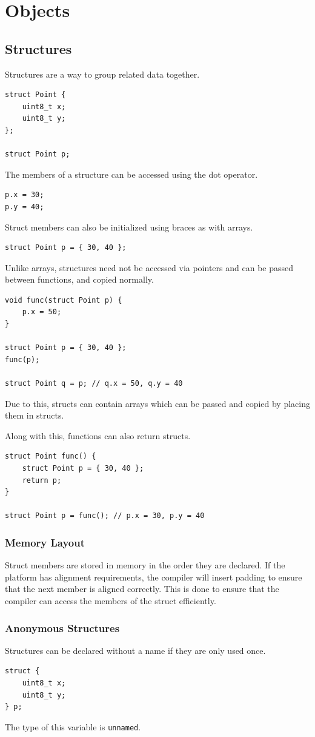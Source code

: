 \documentclass{report}
\begin{document}
\chapter{Objects}
\section{Structures}
Structures are a way to group related data together.
\begin{verbatim}
struct Point {
    uint8_t x;
    uint8_t y;
};

struct Point p;
\end{verbatim}
The members of a structure can be accessed using the dot operator.
\begin{verbatim}
p.x = 30;
p.y = 40;
\end{verbatim}
Struct members can also be initialized using braces as with arrays.
\begin{verbatim}
struct Point p = { 30, 40 };
\end{verbatim}
Unlike arrays, structures need not be accessed via pointers and can be passed between functions, and copied normally.
\begin{verbatim}
void func(struct Point p) {
    p.x = 50;
}

struct Point p = { 30, 40 };
func(p);

struct Point q = p; // q.x = 50, q.y = 40
\end{verbatim}
Due to this, structs can contain arrays which can be passed and copied by placing them
in structs.

Along with this, functions can also return structs.
\begin{verbatim}
struct Point func() {
    struct Point p = { 30, 40 };
    return p;
}

struct Point p = func(); // p.x = 30, p.y = 40
\end{verbatim}
\subsection{Memory Layout}
Struct members are stored in memory in the order they are declared.
If the platform has alignment requirements, the compiler will insert padding
to ensure that the next member is aligned correctly. This is done to
ensure that the compiler can access the members of the struct efficiently.
\subsection{Anonymous Structures}
Structures can be declared without a name if they are only used once.
\begin{verbatim}
struct {
    uint8_t x;
    uint8_t y;
} p;
\end{verbatim}
The type of this variable is \texttt{unnamed}.
\end{document}
